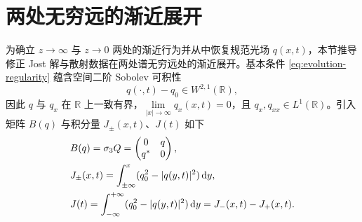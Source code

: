 \section{两处无穷远的渐近展开}\label{ch:asymptotics}

为确立 $z\to\infty$ 与 $z\to0$ 两处的渐近行为并从中恢复规范光场 $q(x,t)$，本节推导修正 Jost 解与散射数据在两处谱无穷远处的渐近展开。基本条件 \eqref{eq:evolution-regularity} 蕴含空间二阶 Sobolev 可积性
\begin{equation}\label{eq:highenergy-assumption}
q(\cdot,t)-q_0\in W^{2,1}(\mathbb R),
\end{equation}
因此 $q$ 与 $q_x$ 在 $\mathbb R$ 上一致有界，$\lim\limits_{|x|\to\infty}q_x(x,t)=0$，且 $q_x,q_{xx}\in L^1(\mathbb R)$。引入矩阵 $B(q)$ 与积分量 $J_\pm(x,t)$、$J(t)$ 如下
\begin{align}
&B(q)=\sigma_3 Q=\begin{pmatrix}0&q\\{q}^{*}&0\end{pmatrix},\label{eq:Bdef}\\
&J_\pm(x,t)=\int_{\pm\infty}^{x}(q_0^2-|q(y,t)|^2)\,\mathrm{d} y,\label{eq:Jpmdef}\\
&J(t)=\int_{-\infty}^{+\infty}(q_0^2-|q(y,t)|^2)\,\mathrm{d} y=J_-(x,t)-J_+(x,t).\label{eq:Jtotdef}
\end{align}

